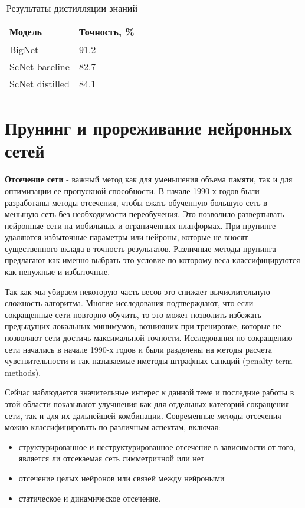 \documentclass[oneside,final,12pt]{extreport}
\begin{document}
\begin{table}[H]
\caption{Результаты дистилляции знаний}
\label{table_1.1}
\begin{tabularx}{\textwidth}{|X|X|} %
\hline
Модель & Точность, \% \\ \hline
BigNet & 91.2 \\ 
ScNet baseline & 82.7 \\ 
ScNet distilled & 84.1 \\ \hline 

\end{tabularx}
\end{table}

\chapter{Прунинг и прореживание нейронных сетей}
\textbf{Отсечение сети} - важный метод как для уменьшения объема памяти, так и для оптимизации ее пропускной способности. В начале 1990-х годов были разработаны методы отсечения, чтобы сжать обученную большую сеть в меньшую сеть без необходимости переобучения. Это позволило развертывать нейронные сети на мобильных и ограниченных платформах. При прунинге удаляются избыточные параметры или нейроны, которые не вносят существенного вклада в точность результатов. Различные методы прунинга предлагают как именно выбрать это условие по которому  веса классифицируются как ненужные и избыточные.  

Так как мы убираем некоторую часть весов это снижает вычислительную сложность алгоритма. Многие исследования подтверждают, что если сокращенные сети повторно обучить, то это может позволить избежать предыдущих локальных минимумов, возникших при тренировке, которые не позволяют сети достичь максимальной точности. Исследования по сокращению сети начались в начале 1990-х годов и были разделены на методы расчета чувствительности и так называемые иметоды штрафных санкций (penalty-term methods).

Сейчас наблюдается значительные интерес к данной теме и последние работы в этой области показывают улучшения как для отдельных категорий сокращения сети, так и для их дальнейшей комбинации. Современные методы отсечения можно классифицировать по различным аспектам, включая:
\begin{itemize}
    \item структурированное и неструктурированное отсечение в зависимости от того, является ли отсекаемая сеть симметричной или нет
    \item отсечение целых нейронов или связей между нейроными
    \item статическое и динамическое отсечение. 
\end{itemize}
\end{document}
